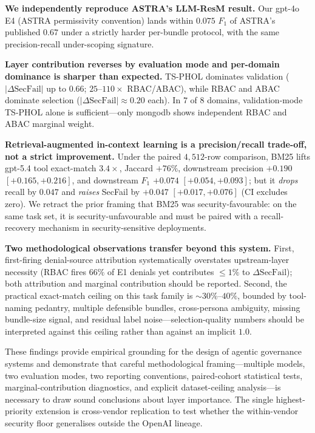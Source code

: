 \documentclass[10pt,a4paper,twocolumn]{article}
\begin{document}
\textbf{We independently reproduce ASTRA's LLM-ResM result.} Our gpt-4o E4 (ASTRA permissivity convention) lands within $0.075$ $F_1$ of ASTRA's published $0.67$ under a strictly harder per-bundle protocol, with the same precision-recall under-scoping signature.

\textbf{Layer contribution reverses by evaluation mode and per-domain dominance is sharper than expected.} TS-PHOL dominates validation ($|\Delta\mathrm{SecFail}|$ up to $0.66$; $25$--$110\times$ RBAC/ABAC), while RBAC and ABAC dominate selection ($|\Delta\mathrm{SecFail}| \approx 0.20$ each). In $7$ of $8$ domains, validation-mode TS-PHOL alone is sufficient---only mongodb shows independent RBAC and ABAC marginal weight.

\textbf{Retrieval-augmented in-context learning is a precision/recall trade-off, not a strict improvement.} Under the paired $4{,}512$-row comparison, BM25 lifts gpt-5.4 tool exact-match $3.4\times$, Jaccard $+76\%$, downstream precision $+0.190$ $[+0.165, +0.216]$, and downstream $F_1$ $+0.074$ $[+0.054, +0.093]$; but it \emph{drops} recall by $0.047$ and \emph{raises} SecFail by $+0.047$ $[+0.017, +0.076]$ (CI excludes zero). We retract the prior framing that BM25 was security-favourable: on the same task set, it is security-unfavourable and must be paired with a recall-recovery mechanism in security-sensitive deployments.

\textbf{Two methodological observations transfer beyond this system.} First, first-firing denial-source attribution systematically overstates upstream-layer necessity (RBAC fires $66\%$ of E1 denials yet contributes $\leq 1\%$ to $\Delta\mathrm{SecFail}$); both attribution and marginal contribution should be reported. Second, the practical exact-match ceiling on this task family is $\sim 30\%$--$40\%$, bounded by tool-naming pedantry, multiple defensible bundles, cross-persona ambiguity, missing bundle-size signal, and residual label noise---selection-quality numbers should be interpreted against this ceiling rather than against an implicit $1.0$.

These findings provide empirical grounding for the design of agentic governance systems and demonstrate that careful methodological framing---multiple models, two evaluation modes, two reporting conventions, paired-cohort statistical tests, marginal-contribution diagnostics, and explicit dataset-ceiling analysis---is necessary to draw sound conclusions about layer importance. The single highest-priority extension is cross-vendor replication to test whether the within-vendor security floor generalises outside the OpenAI lineage.
\end{document}
